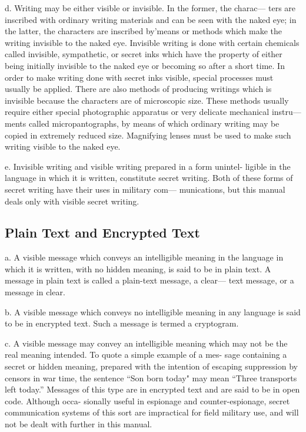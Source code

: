 d. Writing may be either visible or invisible. In the former, the charac—
ters are inscribed with ordinary writing materials and can be seen with
the naked eye; in the latter, the characters are inscribed by'means or
methods which make the writing invisible to the naked eye. Invisible
writing is done with certain chemicals called invisible, sympathetic, or
secret inks which have the property of either being initially invisible to
the naked eye or becoming so after a short time. In order to make writing
done with secret inks visible, special processes must usually be applied.
There are also methods of producing writings which is invisible because
the characters are of microscopic size. These methods usually require
either special photographic apparatus or very delicate mechanical instru—
ments called micropantographs, by means of which ordinary writing may
be copied in extremely reduced size. Magnifying lenses must be used to
make such writing visible to the naked eye.

e. Invisible writing and visible writing prepared in a form unintel-
ligible in the language in which it is written, constitute secret writing.
Both of these forms of secret writing have their uses in military com—
munications, but this manual deals only with visible secret writing.

\subsection{Plain Text and Encrypted Text}

a. A visible message which conveys an intelligible meaning in the
language in which it is written, with no hidden meaning, is said to be in
plain text. A message in plain text is called a plain-text message, a clear—
text message, or a message in clear.

b. A visible message which conveys no intelligible meaning in any
language is said to be in encrypted text. Such a message is termed a
cryptogram.

c. A visible message may convey an intelligible meaning which may
not be the real meaning intended. To quote a simple example of a mes-
sage containing a secret or hidden meaning, prepared with the intention
of escaping suppression by censors in war time, the sentence “Son born
today" may mean “Three transports left today.” Messages of this type
are in encrypted text and are said to be in open code. Although occa-
sionally useful in espionage and counter-espionage, secret communication
systems of this sort are impractical for ﬁeld military use, and will not
be dealt with further in this manual.

